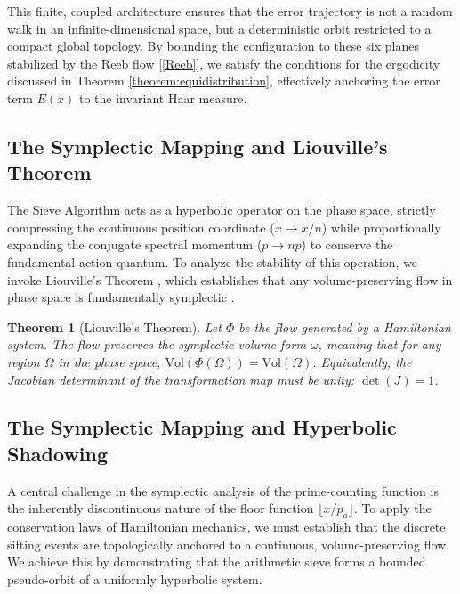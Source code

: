 \documentclass[sn-mathphys-num, pdflatex, referee]{sn-jnl}
\newtheorem{theorem}{Theorem}[section]
\begin{document}
This finite, coupled architecture ensures that the error trajectory is not a random walk in an infinite-dimensional space, but a deterministic orbit restricted to a compact global topology. By bounding the configuration to these six planes stabilized by the Reeb flow [\ref{Reeb}], we satisfy the conditions for the ergodicity discussed in Theorem \ref{theorem:equidistribution}, effectively anchoring the error term $E(x)$ to the invariant Haar measure.

\subsection{The Symplectic Mapping and Liouville's Theorem}
\label{sec:map_definition}

The Sieve Algorithm acts as a hyperbolic operator on the phase space, strictly compressing the continuous position coordinate ($x \to x/n$) while proportionally expanding the conjugate spectral momentum ($p \to np$) to conserve the fundamental action quantum. To analyze the stability of this operation, we invoke Liouville's Theorem \cite{arnold1989}, which establishes that any volume-preserving flow in phase space is fundamentally symplectic .

\begin{theorem}[Liouville's Theorem]
\label{thm:liouville}
Let $\Phi$ be the flow generated by a Hamiltonian system. The flow preserves the symplectic volume form $\omega$, meaning that for any region $\Omega$ in the phase space, $\text{Vol}(\Phi(\Omega)) = \text{Vol}(\Omega)$. Equivalently, the Jacobian determinant of the transformation map must be unity: $\det(J) = 1$.
\end{theorem}
\subsection{The Symplectic Mapping and Hyperbolic Shadowing}

A central challenge in the symplectic analysis of the prime-counting function is the inherently discontinuous nature of the floor function $\lfloor x/p_{a} \rfloor$. To apply the conservation laws of Hamiltonian mechanics, we must establish that the discrete sifting events are topologically anchored to a continuous, volume-preserving flow. We achieve this by demonstrating that the arithmetic sieve forms a bounded pseudo-orbit of a uniformly hyperbolic system.
\end{document}
